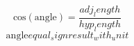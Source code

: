 \[\text{{cos}}(\text{{{angle}}})=\frac{{{adj_length}}}{{{hyp_length}}}\]
\[\text{{{angle}}}{equal_sign}{result_with_unit}\]
